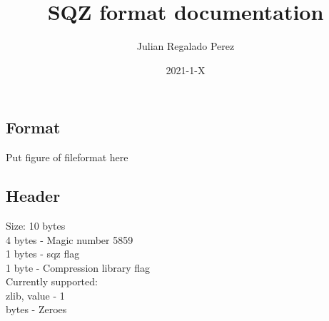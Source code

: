 \documentclass{article}
\title{SQZ format documentation}
\date{2021-1-X}
\author{Julian Regalado Perez}
\begin{document}
    \pagestyle{fancy}
    \maketitle
    \newpage

    \section*{}
    \subsection*{Format}
    Put figure of fileformat here
    \subsection*{Header}
    Size: 10 bytes
    \\4 bytes - Magic number 5859
    \\1 bytes - sqz flag
    \\1 byte  - Compression library flag
    \\\indent Currently supported:
    \\\indent zlib, value - 1
    \\ bytes - Zeroes
\end{document}
